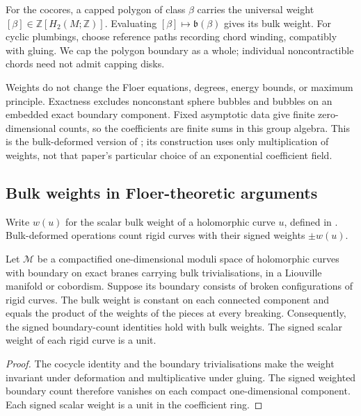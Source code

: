 \documentclass[a4paper]{amsart}
\newcommand{\ZZ}{\mathbb{Z}}
\numberwithin{equation}{section}
\begin{document}
For the cocores, a capped polygon of class $\beta$ carries the universal
weight $[\beta]\in\ZZ[H_2(M;\ZZ)]$. Evaluating
$[\beta]\mapsto\mathfrak b(\beta)$ gives its bulk weight. For cyclic
plumbings, choose reference paths recording chord winding, compatibly
with gluing. We cap the polygon boundary as a whole; individual
noncontractible chords need not admit capping disks.

Weights do not change the Floer equations, degrees, energy bounds,
or maximum principle. Exactness excludes nonconstant sphere bubbles and bubbles
on an embedded exact boundary component. Fixed asymptotic data give
finite zero-dimensional counts, so the coefficients are finite sums
in this group algebra. This is the bulk-deformed
version of \cite[Sections~3.1 and 4.3.2]{SiegelTwist}; its construction
uses only multiplication of weights, not that paper's particular
choice of an exponential coefficient field.



\subsection{Bulk weights in Floer-theoretic arguments}
\label{subsec:coefficient-principle}

Write $w(u)$ for the scalar bulk weight of a holomorphic curve $u$,
defined in . Bulk-deformed operations count rigid
curves with their signed weights $\pm w(u)$.

\begin{lemma}\label{lem:coefficient-principle}
Let $\mathcal M$ be a compactified one-dimensional moduli space of
holomorphic curves with boundary on exact branes carrying bulk
trivialisations, in a Liouville manifold or cobordism. Suppose its
boundary consists of broken configurations of rigid curves. The bulk
weight is constant on each connected component and equals the product
of the weights of the pieces at every breaking. Consequently, the
signed boundary-count identities hold with bulk weights. The signed
scalar weight of each rigid curve is a unit.
\end{lemma}

\begin{proof}
The cocycle identity and the boundary trivialisations make the weight
invariant under deformation and multiplicative under gluing. The signed
weighted boundary count therefore vanishes on each compact
one-dimensional component. Each signed scalar weight is a unit in the
coefficient ring.
\end{proof}
\end{document}
